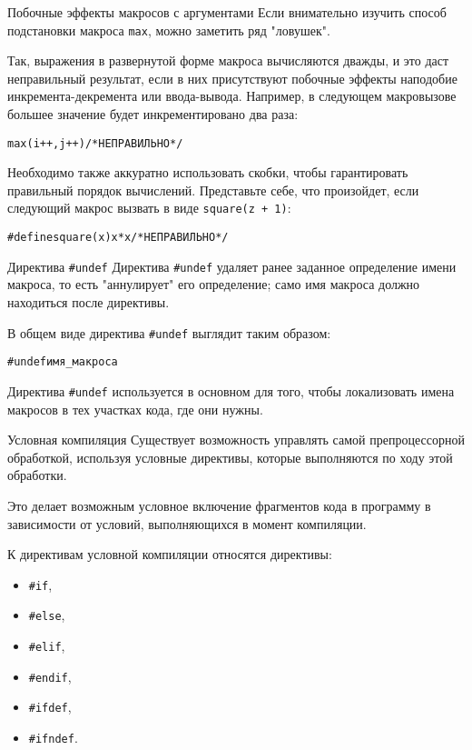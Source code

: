 \documentclass{beamer}
\begin{document}
\begin{frame}{Побочные эффекты макросов с аргументами}
    Если внимательно изучить способ подстановки макроса \texttt{max}, можно заметить ряд "ловушек".
    
    Так, выражения в развернутой форме макроса вычисляются дважды, и это даст неправильный результат, если в них присутствуют побочные эффекты наподобие инкремента-декремента или ввода-вывода. Например, в следующем макровызове большее значение будет инкрементировано два раза:
    
    \begin{alltt}
    max(i++, j++) /* НЕПРАВИЛЬНО */
    \end{alltt}
    
    Необходимо также аккуратно использовать скобки, чтобы гарантировать правильный порядок вычислений. Представьте себе, что произойдет, если следующий макрос вызвать в виде \texttt{square(z + 1)}:
    
    \begin{alltt}
    \#define square(x) x * x /* НЕПРАВИЛЬНО */
    \end{alltt}
\end{frame}

\begin{frame}{Директива \texttt{\#undef}}
    Директива \texttt{\#undef} удаляет ранее заданное определение имени макроса, то есть "аннулирует" его определение; само имя макроса должно находиться после директивы.
    
    В общем виде директива \texttt{\#undef} выглядит таким образом:
    
    \begin{alltt}
    \#undef имя\_макроса
    \end{alltt}
    
    Директива \texttt{\#undef} используется в основном для того, чтобы локализовать имена макросов в тех участках кода, где они нужны.
\end{frame}

\begin{frame}{Условная компиляция}
    Существует возможность управлять самой препроцессорной обработкой, используя условные директивы, которые выполняются по ходу этой обработки.
    
    Это делает возможным условное включение фрагментов кода в программу в зависимости от условий, выполняющихся в момент компиляции.
    
    К директивам условной компиляции относятся директивы:
    \begin{itemize}
        \item \texttt{\#if},
        \item \texttt{\#else},
        \item \texttt{\#elif},
        \item \texttt{\#endif},
        \item \texttt{\#ifdef},
        \item \texttt{\#ifndef}.
    \end{itemize}
\end{frame}
\end{document}
